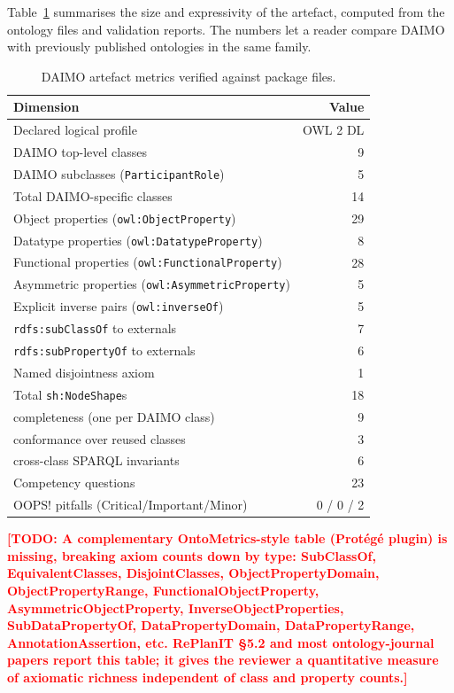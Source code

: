 \documentclass[Afour,sagev,times]{sagej}
\newcommand{\code}[1]{\texttt{#1}}
\newcommand{\TODO}[1]{\textcolor{red}{\textbf{[TODO: #1]}}}
\begin{document}
Table~\ref{tab:metrics} summarises the size and expressivity of the artefact, computed from the ontology files and validation reports. The numbers let a reader compare DAIMO with previously published ontologies in the same family.

\begin{table}[t]
\small\sf\centering
\caption{DAIMO artefact metrics verified against package files.\label{tab:metrics}}
\begin{tabular}{@{}p{4.6cm}r@{}}
\toprule
\textbf{Dimension} & \textbf{Value} \\
\midrule
Declared logical profile & OWL 2 DL \\
DAIMO top-level classes & 9 \\
DAIMO subclasses (\code{ParticipantRole}) & 5 \\
Total DAIMO-specific classes & 14 \\
Object properties (\code{owl:ObjectProperty}) & 29 \\
Datatype properties (\code{owl:DatatypeProperty}) & 8 \\
Functional properties (\code{owl:FunctionalProperty}) & 28 \\
Asymmetric properties (\code{owl:AsymmetricProperty}) & 5 \\
Explicit inverse pairs (\code{owl:inverseOf}) & 5 \\
\code{rdfs:subClassOf} to externals & 7 \\
\code{rdfs:subPropertyOf} to externals & 6 \\
Named disjointness axiom & 1 \\
Total \code{sh:NodeShape}s & 18 \\
\quad completeness (one per DAIMO class) & 9 \\
\quad conformance over reused classes & 3 \\
\quad cross-class SPARQL invariants & 6 \\
Competency questions & 23 \\
OOPS! pitfalls (Critical/Important/Minor) & 0 / 0 / 2 \\
\bottomrule
\end{tabular}
\end{table}

\TODO{A complementary OntoMetrics-style table (Prot\'eg\'e plugin) is missing, breaking axiom counts down by type: SubClassOf, EquivalentClasses, DisjointClasses, ObjectPropertyDomain, ObjectPropertyRange, FunctionalObjectProperty, AsymmetricObjectProperty, InverseObjectProperties, SubDataPropertyOf, DataPropertyDomain, DataPropertyRange, AnnotationAssertion, etc. RePlanIT \S5.2 and most ontology-journal papers report this table; it gives the reviewer a quantitative measure of axiomatic richness independent of class and property counts.}
\end{document}
